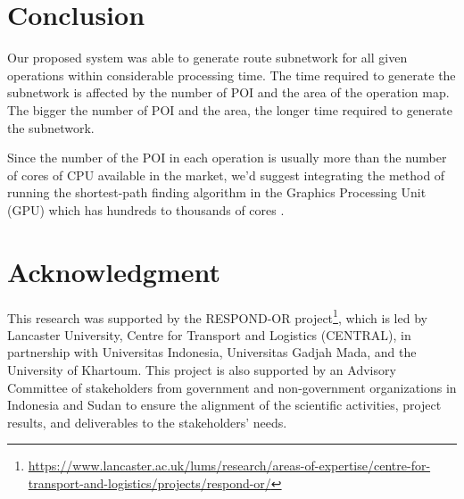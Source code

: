 \documentclass[conference]{IEEEtran}
\begin{document}
\section{Conclusion}

Our proposed system was able to generate route subnetwork for all given operations within considerable processing time. The time required to generate the subnetwork is affected by the number of POI and the area of the operation map. The bigger the number of POI and the area, the longer time required to generate the subnetwork.

Since the number of the POI in each operation is usually more than the number of cores of CPU available in the market, we'd suggest integrating the method of running the shortest-path finding algorithm in the Graphics Processing Unit (GPU) which has hundreds to thousands of cores \cite{harish2007accelerating}.

\section*{Acknowledgment}

This research was supported by the RESPOND-OR project\footnote{\url{https://www.lancaster.ac.uk/lums/research/areas-of-expertise/centre-for-transport-and-logistics/projects/respond-or/}}, which is led by Lancaster University, Centre for Transport and Logistics (CENTRAL), in partnership with Universitas Indonesia, Universitas Gadjah Mada, and the University of Khartoum. This project is also supported by an Advisory Committee of stakeholders from government and non-government organizations in Indonesia and Sudan to ensure the alignment of the scientific activities, project results, and deliverables to the stakeholders’ needs.



\end{document}

